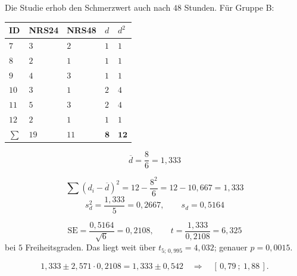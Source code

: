 \begin{merksatz}
Die Studie erhob den Schmerzwert auch nach $48$ Stunden. Für Gruppe B:

\begin{center}
{\small
\renewcommand{\arraystretch}{1.32}
\begin{tabular}{@{}P{1.0cm}P{1.4cm}P{1.4cm}P{1.2cm}P{1.2cm}@{}}
\toprule
\textbf{ID} & \textbf{NRS24} & \textbf{NRS48} & $d$ & $d^2$\\
\midrule
$7$ & $3$ & $2$ & $1$ & $1$\\
$8$ & $2$ & $1$ & $1$ & $1$\\
$9$ & $4$ & $3$ & $1$ & $1$\\
$10$ & $3$ & $1$ & $2$ & $4$\\
$11$ & $5$ & $3$ & $2$ & $4$\\
$12$ & $2$ & $1$ & $1$ & $1$\\
\midrule
$\sum$ & $19$ & $11$ & $\mathbf{8}$ & $\mathbf{12}$\\
\bottomrule
\end{tabular}}
\end{center}

\[ \overline d = \frac{8}{6} = 1{,}333 \]

\[ \sum (d_i - \overline d)^2 = 12 - \frac{8^2}{6} = 12 - 10{,}667 = 1{,}333 \]
\[ s_d^2 = \frac{1{,}333}{5} = 0{,}2667, \qquad s_d = 0{,}5164 \]

\[ \mathrm{SE} = \frac{0{,}5164}{\sqrt6} = 0{,}2108, \qquad t = \frac{1{,}333}{0{,}2108} = 6{,}325 \]
bei $5$ Freiheitsgraden. Das liegt weit über $t_{5;\,0{,}995} = 4{,}032$; genauer $p = 0{,}0015$.

\[ 1{,}333 \pm 2{,}571 \cdot 0{,}2108 = 1{,}333 \pm 0{,}542 \quad\Longrightarrow\quad [\,0{,}79\ ;\ 1{,}88\,] . \]
\end{merksatz}

